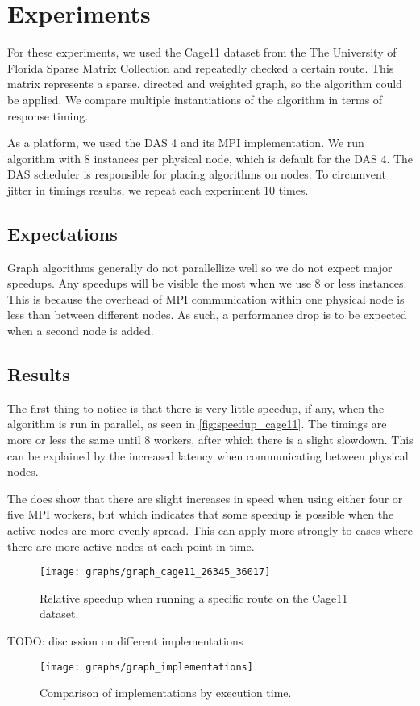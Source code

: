 \chapter{Experiments}

For these experiments, we used the Cage11 dataset from the The University of Florida Sparse Matrix Collection and repeatedly checked a certain route.%
This matrix represents a sparse, directed and weighted graph, so the algorithm could be applied. We compare multiple instantiations of the algorithm in terms of response timing.

As a platform, we used the DAS 4 and its MPI implementation. We run algorithm with 8 instances per physical node, which is default for the DAS 4. %
The DAS scheduler is responsible for placing algorithms on nodes. To circumvent jitter in timings results, we repeat each experiment 10 times.

\section{Expectations}

Graph algorithms generally do not parallellize well %
so we do not expect major speedups. Any speedups will be visible the most when we use 8 or less instances. This is because the overhead of MPI communication within one physical node is less than between different nodes. As such, a performance drop is to be expected when a second node is added.

\section{Results}

The first thing to notice is that there is very little speedup, if any, when the algorithm is run in parallel, as seen in \autoref{fig:speedup_cage11}. The timings are more or less the same until 8 workers, after which there is a slight slowdown. This can be explained by the increased latency when communicating between physical nodes.

The does show that there are slight increases in speed when using either four or five MPI workers, but which indicates that some speedup is possible when the active nodes are more evenly spread. This can apply more strongly to cases where there are more active nodes at each point in time.

\begin{figure}[t]
  \texttt{[image: graphs/graph\_cage11\_26345\_36017]}
  \caption{Relative speedup when running a specific route on the Cage11 dataset.}
  \label{fig:speedup_cage11}
\end{figure}

TODO: discussion on different implementations

\begin{figure}[t]
  \texttt{[image: graphs/graph\_implementations]}
  \caption{Comparison of implementations by execution time.}
  \label{fig:implmementations}
\end{figure}
